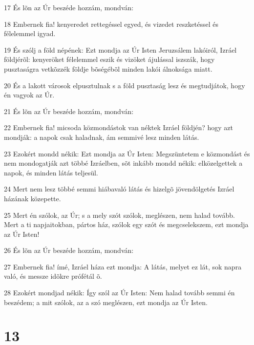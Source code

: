 \par 17 És lõn az Úr beszéde hozzám, mondván:
\par 18 Embernek fia! kenyeredet rettegéssel egyed, és vizedet reszketéssel és félelemmel igyad.
\par 19 És szólj a föld népének: Ezt mondja az Úr Isten Jeruzsálem lakóiról, Izráel földjérõl: kenyeröket félelemmel eszik és vizöket ájulással iszszák, hogy pusztaságra vetkõzzék földje bõségébõl minden lakói álnoksága miatt.
\par 20 És a lakott városok elpusztulnak s a föld pusztaság lesz és megtudjátok, hogy én vagyok az Úr.
\par 21 És lõn az Úr beszéde hozzám, mondván:
\par 22 Embernek fia! micsoda közmondástok van néktek Izráel földjén? hogy azt mondják: a napok csak haladnak, ám semmivé lesz minden látás.
\par 23 Ezokért mondd nékik: Ezt mondja az Úr Isten: Megszüntetem e közmondást és nem mondogatják azt többé Izráelben, sõt inkább mondd nékik: elközelgettek a napok, és minden látás teljesül.
\par 24 Mert nem lesz többé semmi hiábavaló látás és hizelgõ jövendölgetés Izráel házának közepette.
\par 25 Mert én szólok, az Úr; s a mely szót szólok, meglészen, nem halad tovább. Mert a ti napjaitokban, pártos ház, szólok egy szót és megcselekszem, ezt mondja az Úr Isten!
\par 26 És lõn az Úr beszéde hozzám, mondván:
\par 27 Embernek fia! ímé, Izráel háza ezt mondja: A látás, melyet ez lát, sok napra való, és messze idõkre prófétál õ.
\par 28 Ezokért mondjad nékik: Így szól az Úr Isten: Nem halad tovább semmi én beszédem; a mit szólok, az a szó meglészen, ezt mondja az Úr Isten.

\chapter{13}

